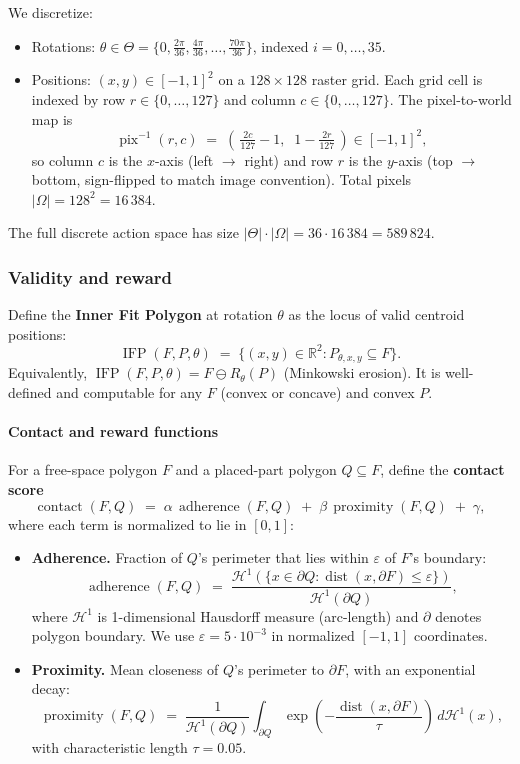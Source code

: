 \documentclass[11pt]{article}
\begin{document}
We discretize:
\begin{itemize}[leftmargin=*,nosep]
  \item Rotations: $\theta \in \Theta = \{0, \tfrac{2\pi}{36}, \tfrac{4\pi}{36}, \dots, \tfrac{70\pi}{36}\}$, indexed $i = 0, \dots, 35$.
  \item Positions: $(x,y) \in [-1,1]^2$ on a $128 \times 128$ raster grid. Each grid cell is indexed by row $r \in \{0, \dots, 127\}$ and column $c \in \{0, \dots, 127\}$. The pixel-to-world map is
  \[
    \operatorname{pix}^{-1}(r, c) \;=\; \left(\,\tfrac{2c}{127} - 1,\;\; 1 - \tfrac{2r}{127}\,\right) \in [-1,1]^2,
  \]
  so column $c$ is the $x$-axis (left $\to$ right) and row $r$ is the $y$-axis (top $\to$ bottom, sign-flipped to match image convention). Total pixels $\lvert\Omega\rvert = 128^2 = 16\,384$.
\end{itemize}

The full discrete action space has size $\lvert\Theta\rvert \cdot \lvert\Omega\rvert = 36 \cdot 16\,384 = 589\,824$.

\subsubsection{Validity and reward}

Define the \textbf{Inner Fit Polygon} at rotation $\theta$ as the locus of valid centroid positions:
\[
  \operatorname{IFP}(F, P, \theta) \;=\; \{ (x,y) \in \mathbb{R}^2 : P_{\theta,x,y} \subseteq F \}.
\]
Equivalently, $\operatorname{IFP}(F, P, \theta) = F \ominus R_\theta(P)$ (Minkowski erosion). It is well-defined and computable for any $F$ (convex or concave) and convex $P$.

\paragraph{Contact and reward functions}
For a free-space polygon $F$ and a placed-part polygon $Q \subseteq F$, define the \textbf{contact score}
\[
  \operatorname{contact}(F, Q) \;=\; \alpha\,\operatorname{adherence}(F, Q) \;+\; \beta\,\operatorname{proximity}(F, Q) \;+\; \gamma,
\]
where each term is normalized to lie in $[0, 1]$:
\begin{itemize}[leftmargin=*,nosep]
  \item \textbf{Adherence.} Fraction of $Q$'s perimeter that lies within $\varepsilon$ of $F$'s boundary:
  \[
    \operatorname{adherence}(F, Q) \;=\; \frac{\mathcal{H}^1\!\left(\{x \in \partial Q : \operatorname{dist}(x, \partial F) \leq \varepsilon\}\right)}{\mathcal{H}^1(\partial Q)},
  \]
  where $\mathcal{H}^1$ is 1-dimensional Hausdorff measure (arc-length) and $\partial$ denotes polygon boundary. We use $\varepsilon = 5 \cdot 10^{-3}$ in normalized $[-1,1]$ coordinates.
  \item \textbf{Proximity.} Mean closeness of $Q$'s perimeter to $\partial F$, with an exponential decay:
  \[
    \operatorname{proximity}(F, Q) \;=\; \frac{1}{\mathcal{H}^1(\partial Q)} \int_{\partial Q} \exp\!\left(-\frac{\operatorname{dist}(x, \partial F)}{\tau}\right) \, d\mathcal{H}^1(x),
  \]
  with characteristic length $\tau = 0.05$.
\end{itemize}
\end{document}
